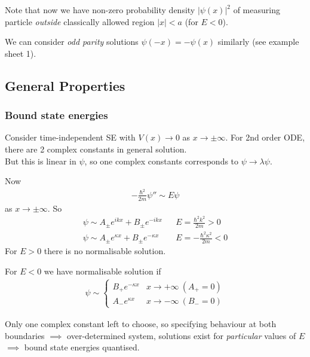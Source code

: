 \documentclass[a4paper]{article}
\begin{document}
Note that now we have non-zero probability density $|\psi\left(x\right)|^2$ of measuring particle \emph{outside} classically allowed region $|x|<a$ (for $E<0$).

We can consider \emph{odd parity} solutions $\psi\left(-x\right) = -\psi\left(x\right)$ similarly (see example sheet 1).

\subsection{General Properties}

\subsubsection{Bound state energies}
Consider time-independent SE with $V\left(x\right) \to 0$ as $x \to \pm \infty$. For 2nd order ODE, there are 2 complex constants in general solution.\\
But this is linear in $\psi$, so one complex constants corresponds to $\psi \to \lambda \psi$.

Now
\begin{equation*}
\begin{aligned}
-\frac{\hbar^2}{2m}\psi'' \sim E\psi
\end{aligned}
\end{equation*}
as $x \to \pm \infty$. So
\begin{equation*}
\begin{aligned}
\psi \sim A_\pm e^{ikx} + B_\pm e^{-ikx} & & E=\frac{\hbar^2 k^2}{2m} > 0\\
\psi \sim A_\pm e^{\kappa x} + B_\pm e^{-\kappa x} & & E=-\frac{\hbar^2\kappa^2}{2m} < 0
\end{aligned}
\end{equation*}
For $E>0$ there is no normalisable solution.

For $E<0$ we have normalisable solution if
\begin{equation*}
\begin{aligned}
\psi \sim \left\{ \begin{array}{ll}
B_+ e^{-\kappa x} & x\to +\infty \  \left(A_+ = 0\right)\\
A_- e^{\kappa x} & x \to -\infty \  \left(B_- = 0\right)
\end{array}
\right.
\end{aligned}
\end{equation*}

Only one complex constant left to choose, so specifying behaviour at both boundaries $\implies$ over-determined system, solutions exist for \emph{particular} values of $E$ $\implies$ bound state energies quantised.
\end{document}

